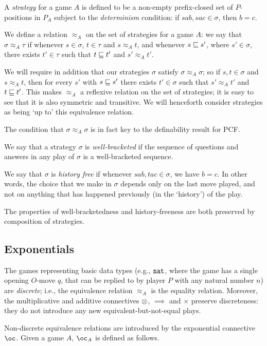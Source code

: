 \documentclass{article}
\begin{document}
A \emph{strategy} for a game $A$ is defined to be a non-empty prefix-closed set of $P$-positions in $P_A$ subject to the \emph{determinism} condition: if $sab,sac\in \sigma$, then $b=c$.

We define a relation $\approx_A$ on the set of strategies for a game $A$: we say that $\sigma\approx_A\tau$ if whenever $s\in\sigma$, $t\in\tau$ and $s\approx_At$, and whenever $s\sqsubseteq s'$, where $s'\in \sigma$, there exists $t'\in \tau$ such that $t\sqsubseteq t'$ and $s'\approx_At'$.

We will require in addition that our strategies $\sigma$ satisfy $\sigma\approx_A\sigma$; so if $s,t\in\sigma$ and $s\approx_At$, then for every $s'$ with $s\sqsubseteq s'$ there exists $t'\in\sigma$ such that $s'\approx_A t'$ and $t\sqsubseteq t'$. This makes $\approx_A$ a reflexive relation on the set of strategies; it is easy to see that it is also symmetric and transitive. We will henceforth consider strategies as being `up to' this equivalence relation.

The condition that $\sigma\approx_A\sigma$ is in fact key to the definability result for PCF.

We say that a strategy $\sigma$ is \emph{well-bracketed} if the sequence of questions and answers in any play of $\sigma$ is a well-bracketed sequence.  

We say that $\sigma$ is \emph{history free} if whenever $sab, tac\in\sigma$, we have $b=c$.  
In other words, the choice that we make in $\sigma$ depends only on the last move played, and not on anything that has happened previously (in the `history') of the play.

The properties of well-bracketedness and history-freeness are both preserved by composition of strategies.

\subsection{Exponentials}

The games representing basic data types (e.g., ${\mathtt{nat}}$, where the game has a single opening $O$-move $q$, that can be replied to by player $P$ with any natural number $n$) are \emph{discrete}; i.e., the equivalence relation $\approx_A$ is the equality relation.  
Moreover, the multiplicative and additive connectives $\otimes$, $\implies$ and $\times$ preserve discreteness: they do not introduce any new equivalent-but-not-equal plays.

Non-discrete equivalence relations are introduced by the exponential connective $\oc$.  
Given a game $A$, $\oc_A$ is defined as follows.
\end{document}
